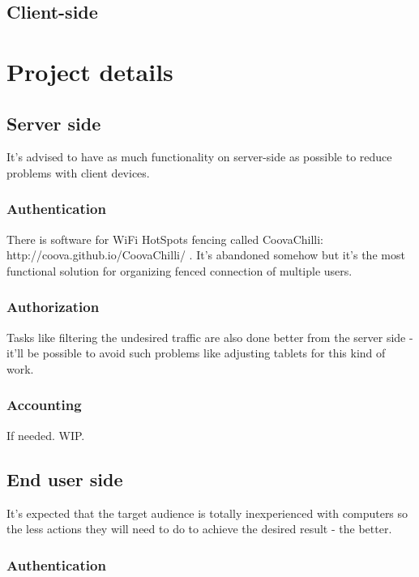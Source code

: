\documentclass[a4paper, sans, booktabs, totpages, english]{report}
\begin{document}
\chapter{Client-side}


\part{Project details}

\chapter{Server side}

It's advised to have as much functionality on server-side as possible
to reduce problems with client devices.


\section{Authentication}

There is software for WiFi HotSpots fencing called CoovaChilli:
http://coova.github.io/CoovaChilli/ . It's abandoned somehow but it's
the most functional solution for organizing fenced connection of
multiple users.


\section{Authorization}

Tasks like filtering the undesired traffic are also done better from
the server side - it'll be possible to avoid such problems like
adjusting tablets for this kind of work.


\section{Accounting}

If needed. WIP.


\chapter{End user side}

It's expected that the target audience is totally inexperienced with
computers so the less actions they will need to do to achieve the
desired result - the better.


\section{Authentication}
\end{document}
